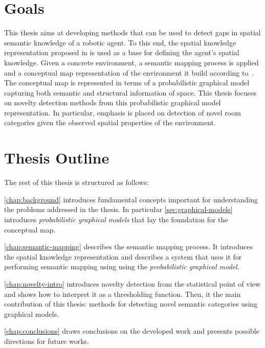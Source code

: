\section{Goals}
This thesis aims at developing methods that can be used to detect gaps in spatial semantic knowledge
of a robotic agent. To this end, the spatial knowledge representation proposed in \cite{pronobis2010ias} 
is used as a base for defining the agent's spatial knowledge. Given a concrete environment, 
a semantic mapping process is applied and a conceptual map representation of the environment it build according
to~\cite{pronobis2011semmap}. The conceptual map is represented in terms of a probabilistic graphical model
capturing both semantic and structural information of space. This thesis focuses on novelty detection methods 
from this probabilistic graphical model representation. In particular, emphasis is placed on detection of 
novel room categories given the observed spatial properties of the environment.

%


\section{Thesis Outline}
The rest of this thesis is structured as follows:

\autoref{chap:background} introduces fundamental concepts important for understanding the problems 
addressed in the thesis. In particular \autoref{sec:graphical-models} introduces \emph{probabilistic 
graphical models} that lay the foundation for the conceptual map.

\autoref{chap:semantic-mapping} describes the semantic mapping process. It introduces the spatial 
knowledge representation and describes a system that uses it for performing semantic mapping using 
using the \emph{probabilistic graphical model}.

\autoref{chap:novelty-intro} introduces novelty detection from the statistical point of view and 
shows how to interpret it as a thresholding function. Then, it the main contribution of this thesis:
methods for detecting novel semantic categories using graphical models.

\autoref{chap:conclusions} draws conclusions on the developed work and presents possible 
directions for future works.



